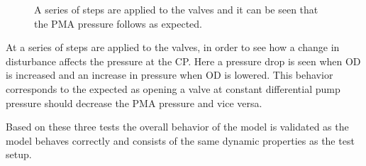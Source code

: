 \begin{figure}[H]
   \centering
    
    \caption{A series of steps are applied to the valves and it can be seen that the PMA pressure follows as expected.}
    \label{disturbance_simulation}
\end{figure}

At  a series of steps are applied to the valves, in order to see how a change in disturbance affects the pressure at the CP. Here a pressure drop is seen when OD is increased and an increase in pressure when OD is lowered. This behavior corresponds to the expected as opening a valve at constant differential pump pressure should decrease the PMA pressure and vice versa.

Based on these three tests the overall behavior of the model is validated as the model behaves correctly and consists of the same dynamic properties as the test setup.   